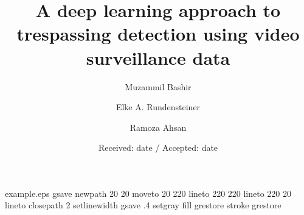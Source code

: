 %
%
%
%
%
\begin{filecontents*}{example.eps}
gsave
newpath
  20 20 moveto
  20 220 lineto
  220 220 lineto
  220 20 lineto
closepath
2 setlinewidth
gsave
  .4 setgray fill
grestore
stroke
grestore
\end{filecontents*}
%
\RequirePackage{fix-cm}
%
\documentclass[twocolumn]{svjour3}          %
\smartqed  %

\usepackage{graphicx}
\usepackage{lineno}
\usepackage{color}
\usepackage{amsmath}




\title{A deep learning approach to trespassing detection using video surveillance data
}

\author{Muzammil Bashir \and
Elke A. Rundensteiner \and
Ramoza Ahsan}



\date{Received: date / Accepted: date}

\maketitle

















